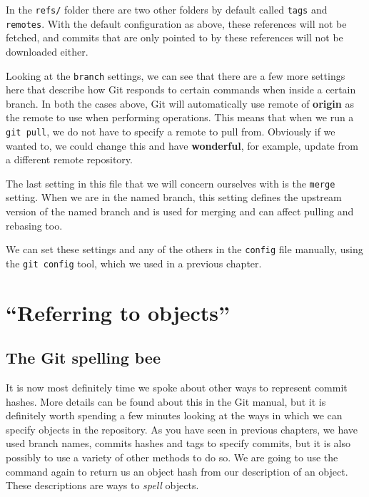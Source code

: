In the \texttt{refs/} folder there are two other folders by default called \texttt{tags} and \texttt{remotes}.
With the default configuration as above, these references will not be fetched,
and commits that are only pointed to by these references will not be downloaded either.

Looking at the \texttt{branch} settings, we can see that there are a few more settings here that describe how Git responds to certain commands when inside a certain branch.
In both the cases above, Git will automatically use remote of \textbf{origin} as the remote to use when performing operations.
This means that when we run a \texttt{git pull}, we do not have to specify a remote to pull from.
Obviously if we wanted to, we could change this and have \textbf{wonderful}, for example, update from a different remote repository.

The last setting in this file that we will concern ourselves with is the \texttt{merge} setting.  
When we are in the named branch, this setting defines the upstream version of the named branch and is used for merging and can affect pulling and rebasing too.

We can set these settings and any of the others in the \texttt{config} file manually,
using the \texttt{git config} tool, which we used in a previous chapter.

\section{``Referring to objects''}
\subsection{The Git spelling bee}
It is now most definitely time we spoke about other ways to represent commit hashes.  
More details can be found about this in the Git manual, but it is definitely worth spending a few minutes looking at the ways in which we can specify objects in the repository.
As you have seen in previous chapters, we have used branch names, commits hashes and tags to specify commits, but it is also possibly to use a variety of other methods to do so.
We are going to use the  command again to return us an object hash from our description of an object.
These descriptions are ways to \emph{spell} objects.

